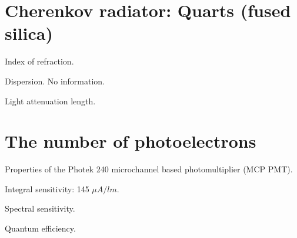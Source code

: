 \documentclass[english]{article}
\begin{document}
\section{Cherenkov radiator: Quarts (fused silica)}

Index of refraction.

Dispersion.
No information.

Light attenuation length.

\section{The number of photoelectrons}

Properties of the Photek 240 microchannel based photomultiplier (MCP PMT). 

Integral sensitivity: 145 $\mu A/lm$. 

Spectral sensitivity. 

Quantum efficiency.
\end{document}
